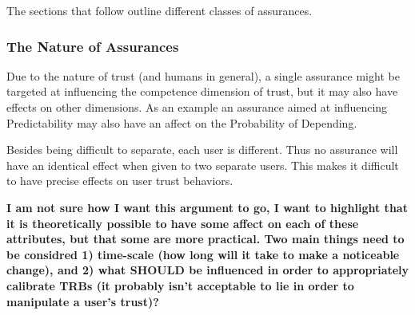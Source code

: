     The sections that follow outline different classes of assurances.

    
    
    
    

    \subsubsection{The  Nature of Assurances}
        Due to the nature of trust (and humans in general), a single assurance might be targeted at influencing the competence dimension of trust, but it may also have effects on other dimensions. As an example an assurance aimed at influencing Predictability may also have an affect on the Probability of Depending.

        Besides being difficult to separate, each user is different. Thus no assurance will have an identical effect when given to two separate users. This makes it difficult to have precise effects on user trust behaviors.

        \textbf{I am not sure how I want this argument to go, I want to highlight that it is theoretically possible to have some affect on each of these attributes, but that some are more practical. Two main things need to be considred 1) time-scale (how long will it take to make a noticeable change), and 2) what SHOULD be influenced in order to appropriately calibrate TRBs (it probably isn't acceptable to lie in order to manipulate a user's trust)?}
